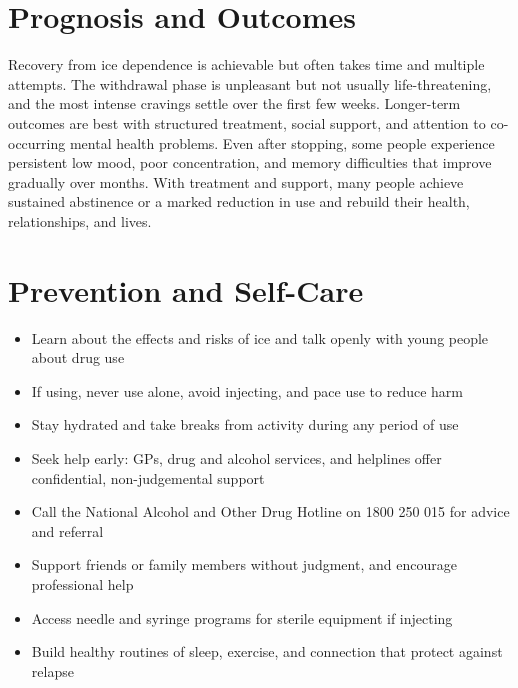\section*{Prognosis and Outcomes}
Recovery from ice dependence is achievable but often takes time and multiple attempts. The withdrawal phase is unpleasant but not usually life-threatening, and the most intense cravings settle over the first few weeks. Longer-term outcomes are best with structured treatment, social support, and attention to co-occurring mental health problems. Even after stopping, some people experience persistent low mood, poor concentration, and memory difficulties that improve gradually over months. With treatment and support, many people achieve sustained abstinence or a marked reduction in use and rebuild their health, relationships, and lives.

\section*{Prevention and Self-Care}
\begin{itemize}
    \item Learn about the effects and risks of ice and talk openly with young people about drug use
    \item If using, never use alone, avoid injecting, and pace use to reduce harm
    \item Stay hydrated and take breaks from activity during any period of use
    \item Seek help early: GPs, drug and alcohol services, and helplines offer confidential, non-judgemental support
    \item Call the National Alcohol and Other Drug Hotline on 1800 250 015 for advice and referral
    \item Support friends or family members without judgment, and encourage professional help
    \item Access needle and syringe programs for sterile equipment if injecting
    \item Build healthy routines of sleep, exercise, and connection that protect against relapse
\end{itemize}

